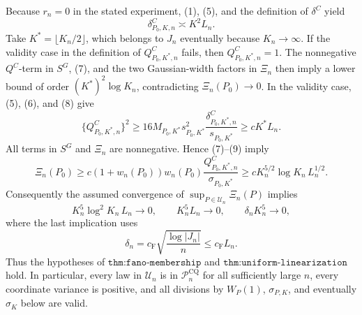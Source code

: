 Because \(r_n=0\) in the stated experiment, (1), (5), and the definition of \(\delta^C\) yield
\[
 \delta^C_{P_0,K,n}\asymp K^2L_n.
 \tag{8}
\]
Take \(K^*=\lfloor K_n/2\rfloor\), which belongs to \(J_n\) eventually because \(K_n\to\infty\).  If the validity case in the definition of \(Q^C_{P_0,K^*,n}\) fails, then \(Q^C_{P_0,K^*,n}=1\).  The nonnegative \(Q^C\)-term in \(S^G\), (7), and the two Gaussian-width factors in \(\Xi_n\) then imply a lower bound of order \((K^*)^2\log K_n\), contradicting \(\Xi_n(P_0)\to0\).  In the validity case, (5), (6), and (8) give
\[
 \{Q^C_{P_0,K^*,n}\}^2
 \geq16M_{P_0,K^*}s_{P_0,K^*}^2
 \frac{\delta^C_{P_0,K^*,n}}{s_{P_0,K^*}}
 \geq cK^*L_n.
 \tag{9}
\]
All terms in \(S^G\) and \(\Xi_n\) are nonnegative.  Hence (7)--(9) imply
\[
 \Xi_n(P_0)
 \geq c(1+w_n(P_0))w_n(P_0)
 \frac{Q^C_{P_0,K^*,n}}{\sigma_{P_0,K^*}}
 \geq cK_n^{5/2}\log K_n\,L_n^{1/2}.
 \tag{10}
\]
Consequently the assumed convergence of \(\sup_{P\in\mathcal U_n}\Xi_n(P)\) implies
\[
 K_n^5\log^2K_n\,L_n\longrightarrow0,\qquad
 K_n^5L_n\longrightarrow0,\qquad
 \delta_nK_n^5\longrightarrow0,
 \tag{11}
\]
where the last implication uses
\[
 \delta_n=c_{\mathrm F}\sqrt{\frac{\log|J_n|}{n}}
 \leq c_{\mathrm F}L_n.
\]
Thus the hypotheses of \(\texttt{thm:fano-membership}\) and \(\texttt{thm:uniform-linearization}\) hold.  In particular, every law in \(\mathcal U_n\) is in \(\mathcal P_n^{\mathrm{CQ}}\) for all sufficiently large \(n\), every coordinate variance is positive, and all divisions by \(W_P(1)\), \(\sigma_{P,K}\), and eventually \(\widehat\sigma_K\) below are valid.

